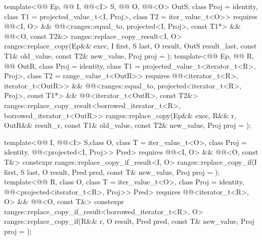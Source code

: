 \begin{itemdecl}
template<@@ Ep, @@ I, @@<I> S,
         @@ O, @@<O> OutS,
         class Proj = identity,
         class T1 = projected_value_t<I, Proj>, class T2 = iter_value_t<O>>
  requires @@<I, O> &&
           @@<ranges::equal_to, projected<I, Proj>, const T1*> &&
           @@<O, const T2&>
  ranges::replace_copy_result<I, O>
    ranges::replace_copy(Ep&& exec, I first, S last, O result, OutS result_last,
                         const T1& old_value, const T2& new_value, Proj proj = {});
template<@@ Ep, @@ R, @@ OutR,
         class Proj = identity, class T1 = projected_value_t<iterator_t<R>, Proj>,
         class T2 = range_value_t<OutR>>
  requires @@<iterator_t<R>, iterator_t<OutR>> &&
           @@<ranges::equal_to,
                                     projected<iterator_t<R>, Proj>, const T1*> &&
           @@<iterator_t<OutR>, const T2&>
  ranges::replace_copy_result<borrowed_iterator_t<R>, borrowed_iterator_t<OutR>>
    ranges::replace_copy(Ep&& exec, R&& r, OutR&& result_r, const T1& old_value,
                         const T2& new_value, Proj proj = {});

template<@@ I, @@<I> S,class O, class T = iter_value_t<O>,
         class Proj = identity, @@<projected<I, Proj>> Pred>
  requires @@<I, O> && @@<O, const T&>
  constexpr ranges::replace_copy_if_result<I, O>
    ranges::replace_copy_if(I first, S last, O result, Pred pred, const T& new_value,
                            Proj proj = {});
template<@@ R, class O, class T = iter_value_t<O>, class Proj = identity,
         @@<projected<iterator_t<R>, Proj>> Pred>
  requires @@<iterator_t<R>, O> && @@<O, const T&>
  constexpr ranges::replace_copy_if_result<borrowed_iterator_t<R>, O>
    ranges::replace_copy_if(R&& r, O result, Pred pred, const T& new_value,
                            Proj proj = {});


\end{itemdecl}
